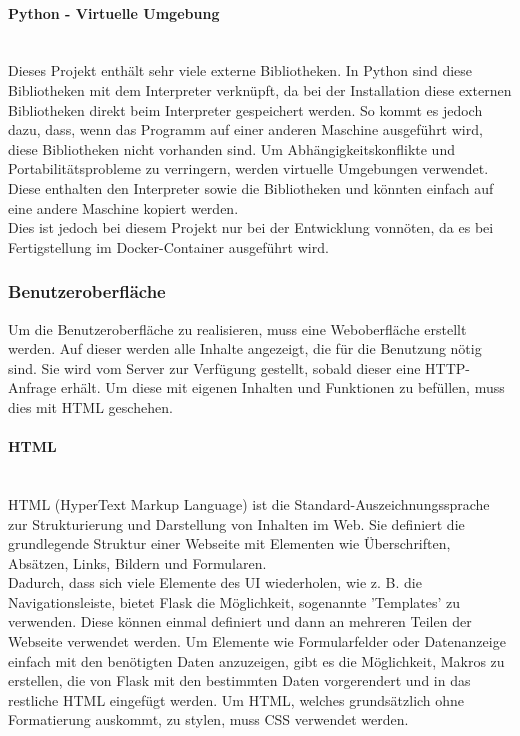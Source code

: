 \paragraph{Python - Virtuelle Umgebung}\mbox{}\\
Dieses Projekt enthält sehr viele externe Bibliotheken. In Python sind diese Bibliotheken mit dem Interpreter verknüpft, da bei der Installation diese externen Bibliotheken direkt beim Interpreter gespeichert werden. So kommt es jedoch dazu, dass, wenn das Programm auf einer anderen Maschine ausgeführt wird, diese Bibliotheken nicht vorhanden sind. Um Abhängigkeitskonflikte und Portabilitätsprobleme zu verringern, werden virtuelle Umgebungen verwendet. Diese enthalten den Interpreter sowie die Bibliotheken und könnten einfach auf eine andere Maschine kopiert werden.\\ Dies ist jedoch bei diesem Projekt nur bei der Entwicklung vonnöten, da es bei Fertigstellung im Docker-Container ausgeführt wird.

\subsubsection{Benutzeroberfläche}

Um die Benutzeroberfläche zu realisieren, muss eine Weboberfläche erstellt werden. Auf dieser werden alle Inhalte angezeigt, die für die Benutzung nötig sind. Sie wird vom Server zur Verfügung gestellt, sobald dieser eine HTTP-Anfrage erhält. Um diese mit eigenen Inhalten und Funktionen zu befüllen, muss dies mit HTML geschehen.

\paragraph{HTML}\mbox{}\\
HTML (HyperText Markup Language) ist die Standard-Auszeichnungssprache zur Strukturierung und Darstellung von Inhalten im Web. Sie definiert die grundlegende Struktur einer Webseite mit Elementen wie Überschriften, Absätzen, Links, Bildern und Formularen. \cite{chatgpt}\\

Dadurch, dass sich viele Elemente des UI wiederholen, wie z. B. die Navigationsleiste, bietet Flask die Möglichkeit, sogenannte 'Templates' zu verwenden. Diese können einmal definiert und dann an mehreren Teilen der Webseite verwendet werden.
Um Elemente wie Formularfelder oder Datenanzeige einfach mit den benötigten Daten anzuzeigen, gibt es die Möglichkeit, Makros zu erstellen, die von Flask mit den bestimmten Daten vorgerendert und in das restliche HTML eingefügt werden.
Um HTML, welches grundsätzlich ohne Formatierung auskommt, zu stylen, muss CSS verwendet werden.

